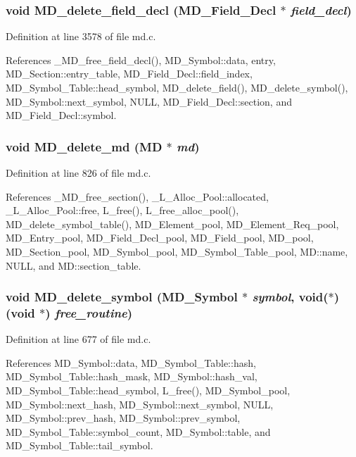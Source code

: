 \subsubsection{\setlength{\rightskip}{0pt plus 5cm}void MD\_\-delete\_\-field\_\-decl (\bf{MD\_\-Field\_\-Decl} $\ast$ {\em field\_\-decl})}\label{md_8c_76528f257b1781ee2ed2d2d7ebdae9b0}




Definition at line 3578 of file md.c.

References \_\-MD\_\-free\_\-field\_\-decl(), MD\_\-Symbol::data, entry, MD\_\-Section::entry\_\-table, MD\_\-Field\_\-Decl::field\_\-index, MD\_\-Symbol\_\-Table::head\_\-symbol, MD\_\-delete\_\-field(), MD\_\-delete\_\-symbol(), MD\_\-Symbol::next\_\-symbol, NULL, MD\_\-Field\_\-Decl::section, and MD\_\-Field\_\-Decl::symbol.
\subsubsection{\setlength{\rightskip}{0pt plus 5cm}void MD\_\-delete\_\-md (\bf{MD} $\ast$ {\em md})}\label{md_8c_99c47f09ca8903d26efed1efe24e352e}




Definition at line 826 of file md.c.

References \_\-MD\_\-free\_\-section(), \_\-L\_\-Alloc\_\-Pool::allocated, \_\-L\_\-Alloc\_\-Pool::free, L\_\-free(), L\_\-free\_\-alloc\_\-pool(), MD\_\-delete\_\-symbol\_\-table(), MD\_\-Element\_\-pool, MD\_\-Element\_\-Req\_\-pool, MD\_\-Entry\_\-pool, MD\_\-Field\_\-Decl\_\-pool, MD\_\-Field\_\-pool, MD\_\-pool, MD\_\-Section\_\-pool, MD\_\-Symbol\_\-pool, MD\_\-Symbol\_\-Table\_\-pool, MD::name, NULL, and MD::section\_\-table.
\subsubsection{\setlength{\rightskip}{0pt plus 5cm}void MD\_\-delete\_\-symbol (\bf{MD\_\-Symbol} $\ast$ {\em symbol}, void($\ast$)(void $\ast$) {\em free\_\-routine})}\label{md_8c_90ee89ec501eb28072b0766dec0dd5fc}




Definition at line 677 of file md.c.

References MD\_\-Symbol::data, MD\_\-Symbol\_\-Table::hash, MD\_\-Symbol\_\-Table::hash\_\-mask, MD\_\-Symbol::hash\_\-val, MD\_\-Symbol\_\-Table::head\_\-symbol, L\_\-free(), MD\_\-Symbol\_\-pool, MD\_\-Symbol::next\_\-hash, MD\_\-Symbol::next\_\-symbol, NULL, MD\_\-Symbol::prev\_\-hash, MD\_\-Symbol::prev\_\-symbol, MD\_\-Symbol\_\-Table::symbol\_\-count, MD\_\-Symbol::table, and MD\_\-Symbol\_\-Table::tail\_\-symbol.

